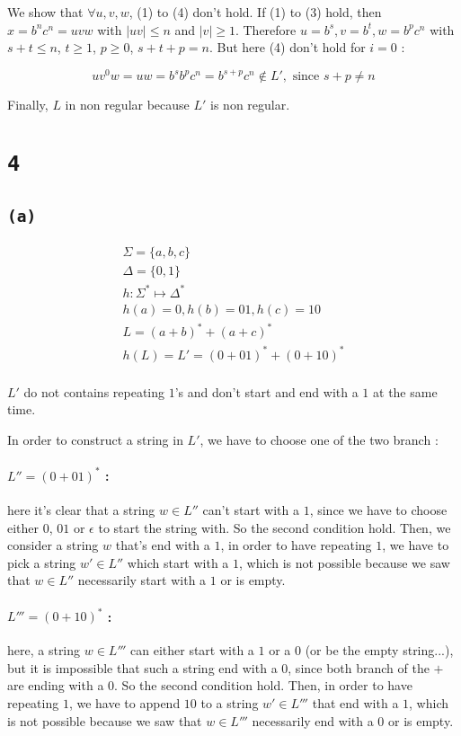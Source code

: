 \documentclass[a4paper,11pt]{report}
\begin{document}
We show that $\forall u,v,w$, (1) to (4) don't hold. If (1) to (3) hold, then $x
= b^nc^n = uvw$ with $|uv| \leq n$ and $|v| \geq 1$. Therefore $u = b^s, v =
b^t, w = b^pc^n$ with $s + t \leq n$, $t \geq 1$, $p \geq 0$, $s+t+p = n$. But
here (4) don't hold for $i=0$ :

\[
  uv^0w = uw = b^sb^pc^n = b^{s+p}c^n \not\in L', \text{ since } s+p \neq n
\]

Finally, $L$ in non regular because $L'$ is non regular.

\section*{\texttt{4}}

\subsection*{\texttt{(a)}}

\begin{gather*}
  \Sigma = \{a,b,c\} \\
  \Delta = \{0,1\} \\
  h : \Sigma^* \mapsto \Delta^* \\
  h(a) = 0, h(b) = 01, h(c) = 10 \\
  L = (a+b)^* + (a+c)^* \\
  h(L) = L' = (0+01)^* + (0+10)^* \\
\end{gather*}

$L'$ do not contains repeating $1$'s and don't start and end with a $1$ at the
same time.

In order to construct a string in $L'$, we have to choose one of the two branch
:

\paragraph{$L'' = (0+01)^*$ :} here it's clear that a string $w \in L''$ can't
start with a $1$, since we have to choose either $0$, $01$ or $\epsilon$ to
start the string with. So the second condition hold. Then, we consider a string
$w$ that's end with a $1$, in order to have repeating $1$, we have to pick a
string $w' \in L''$ which start with a $1$, which is not possible because we saw
that $w \in L''$ necessarily start with a $1$ or is empty.

\paragraph{$L''' = (0+10)^*$ :} here, a string $w \in L'''$ can either start
with a $1$ or a $0$ (or be the empty string...), but it is impossible that such
a string end with a $0$, since both branch of the $+$ are ending with a $0$. So
the second condition hold. Then, in order to have repeating $1$, we have to
append $10$ to a string $w' \in L'''$ that end with a $1$, which is not possible
because we saw that $w \in L'''$ necessarily end with a $0$ or is empty.
\end{document}
